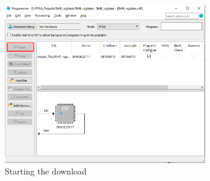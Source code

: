 \documentclass[12pt]{article}
\begin{document}
\begin{enumerate}
\begin{figure}[H]
         \centering
         \includegraphics[height=7cm,keepaspectratio]{downloading to board/6.png}
         \caption{Starting the download}
     \end{figure}
     
 \end{enumerate}
 
\end{document}
